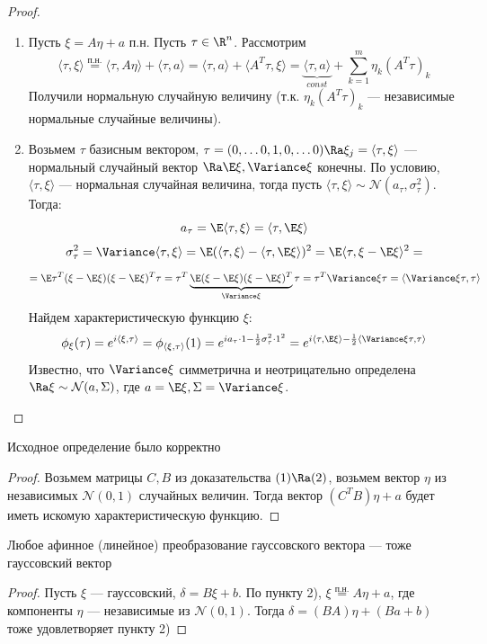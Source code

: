\begin{proof}
\begin{enumerate}
        \item[\((2) \Ra (3)\)] Пусть \(\xi = A\eta + a\) п.н. Пусть \(\tau \in \R^n\). Рассмотрим 
        \[\langle \tau, \xi \rangle \stackrel{\text{п.н.}}{=} \langle \tau, A\eta \rangle + \langle \tau, a \rangle = \langle \tau, a \rangle + \langle A^T\tau, \xi \rangle = \underbrace{\langle \tau, a \rangle}_{const} + \sum_{k = 1}^m \eta_k (A^T\tau)_k\]
        Получили нормальную случайную величину (т.к. \(\eta_k(A^T\tau)_k\) --- независимые нормальные случайные величины).
        \item[\((3) \Ra (1)\)] Возьмем \(\tau\) базисным вектором, \(\tau = (0, \dots 0, 1, 0, \dots 0) \Ra \xi_j = \langle \tau, \xi \rangle\) --- нормальный случайный вектор \(\Ra \E\xi, \Variance\xi\) конечны. По условию, \(\langle \tau, \xi \rangle\) --- нормальная случайная величина, тогда пусть \(\langle \tau, \xi \rangle \sim \mathcal{N}(a_\tau, \sigma_\tau^2)\). Тогда:
        \[a_\tau = \E \langle \tau, \xi \rangle = \langle \tau, \E\xi \rangle\]
        \[\sigma_\tau^2 = \Variance\langle \tau, \xi \rangle = \E(\langle \tau, \xi \rangle - \langle \tau, \E\xi \rangle)^2 = \E\langle \tau, \xi - \E\xi \rangle^2 = \]
        \[= \E\tau^T(\xi - \E\xi)(\xi - \E\xi)^T\tau = \tau^T\underbrace{\E(\xi - \E\xi)(\xi - \E\xi)^T}_{\Variance \xi}\tau = \tau^T\Variance \xi \tau = \langle\Variance \xi \tau, \tau \rangle\]
        Найдем характеристическую функцию \(\xi\):
        \[\phi_\xi(\tau) = e^{i\langle \xi, \tau \rangle} = \phi_{\langle \xi, \tau \rangle}(1) = e^{ia_\tau \cdot 1 - \frac{1}{2}\sigma_\tau^2\cdot 1^2} = e^{i\langle \tau, \E\xi \rangle - \frac{1}{2}\langle \Variance \xi \tau, \tau \rangle}\]
        Известно, что \(\Variance \xi\) симметрична и неотрицательно определена \(\Ra \xi \sim \mathcal{N}(a, \Sigma)\), где \(a = \E \xi, \Sigma = \Variance \xi\).
    \end{enumerate}
\end{proof}

\begin{corollary}
    Исходное определение было корректно
\end{corollary}
\begin{proof}
    Возьмем матрицы \(C, B\) из доказательства \((1) \Ra (2)\), возьмем вектор \(\eta\) из независимых \(\mathcal{N}(0, 1)\) случайных величин. Тогда вектор \((C^TB)\eta + a\) будет иметь искомую характеристическую функцию.
\end{proof}

\begin{corollary}
    Любое афинное (линейное) преобразование гауссовского вектора --- тоже гауссовский вектор
\end{corollary}
\begin{proof}
    Пусть \(\xi\) --- гауссовский, \(\delta = B\xi + b\). По пункту 2), \(\xi \stackrel{\text{п.н.}}{=} A\eta + a\), где компоненты \(\eta\) --- независимые из \(\mathcal{N}(0, 1)\). Тогда \(\delta = (BA)\eta + (Ba + b)\) тоже удовлетворяет пункту 2)
\end{proof}

